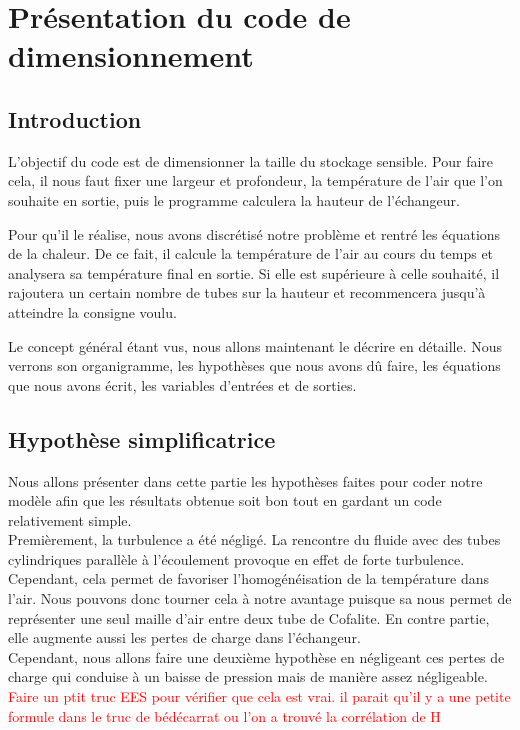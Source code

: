 \chapter{Présentation du code de dimensionnement}

\section{Introduction}

L'objectif du code est de dimensionner la taille du stockage sensible. Pour faire cela, il nous faut fixer une largeur et profondeur, la température de l'air que l'on souhaite en sortie, puis le programme calculera la hauteur de l'échangeur. 

Pour qu'il le réalise, nous avons discrétisé notre problème et rentré les équations de la chaleur. De ce fait, il calcule la température de l'air au cours du temps et analysera sa température final en sortie. Si elle est supérieure à celle souhaité, il rajoutera un certain nombre de tubes sur la hauteur et recommencera jusqu'à atteindre la consigne voulu.

Le concept général étant vus, nous allons maintenant le décrire en détaille. Nous verrons son organigramme, les hypothèses que nous avons dû faire, les équations que nous avons écrit, les variables d'entrées et de sorties.


\section{Hypothèse simplificatrice}

	Nous allons présenter dans cette partie les hypothèses faites pour coder notre modèle afin que les résultats obtenue soit bon tout en gardant un code relativement simple.\\
	
	Premièrement, la turbulence a été négligé. La rencontre du fluide avec des tubes cylindriques parallèle à l'écoulement provoque en effet de forte turbulence. Cependant, cela permet de favoriser l'homogénéisation de la température dans l'air. Nous pouvons donc tourner cela à notre avantage puisque sa nous permet de représenter une seul maille d'air entre deux tube de Cofalite. En contre partie, elle augmente aussi les pertes de charge dans l'échangeur. \\
	
	
	Cependant, nous allons faire une deuxième hypothèse en négligeant ces pertes de charge qui conduise à un baisse de pression mais de manière assez négligeable.  \textcolor{red}{Faire un ptit truc EES pour vérifier que cela est vrai. il parait qu'il y a une petite formule dans le truc de bédécarrat ou l'on a trouvé la corrélation de H} 
	
